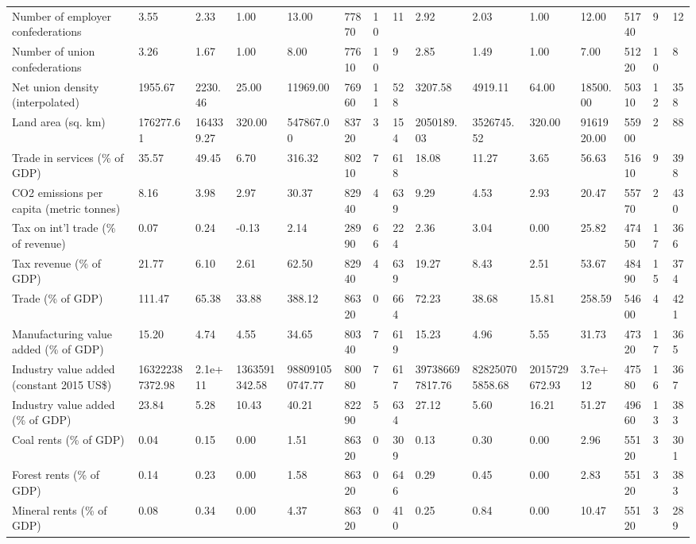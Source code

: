 \begin{longtable}{lllllllllllllll}
\addlinespace
Number of employer confederations & 3.55 & 2.33 & 1.00 & 13.00 & 77870 & 10 & 11 & 2.92 & 2.03 & 1.00 & 12.00 & 51740 & 9 & 12\\
Number of union confederations & 3.26 & 1.67 & 1.00 & 8.00 & 77610 & 10 & 9 & 2.85 & 1.49 & 1.00 & 7.00 & 51220 & 10 & 8\\
Net union density (interpolated) & 1955.67 & 2230.46 & 25.00 & 11969.00 & 76960 & 11 & 528 & 3207.58 & 4919.11 & 64.00 & 18500.00 & 50310 & 12 & 358\\
Land area (sq. km) & 176277.61 & 164339.27 & 320.00 & 547867.00 & 83720 & 3 & 154 & 2050189.03 & 3526745.52 & 320.00 & 9161920.00 & 55900 & 2 & 88\\
Trade in services (\% of GDP) & 35.57 & 49.45 & 6.70 & 316.32 & 80210 & 7 & 618 & 18.08 & 11.27 & 3.65 & 56.63 & 51610 & 9 & 398\\
\addlinespace
CO2 emissions per capita (metric tonnes) & 8.16 & 3.98 & 2.97 & 30.37 & 82940 & 4 & 639 & 9.29 & 4.53 & 2.93 & 20.47 & 55770 & 2 & 430\\
Tax on int'l trade (\% of revenue) & 0.07 & 0.24 & -0.13 & 2.14 & 28990 & 66 & 224 & 2.36 & 3.04 & 0.00 & 25.82 & 47450 & 17 & 366\\
Tax revenue (\% of GDP) & 21.77 & 6.10 & 2.61 & 62.50 & 82940 & 4 & 639 & 19.27 & 8.43 & 2.51 & 53.67 & 48490 & 15 & 374\\
Trade (\% of GDP) & 111.47 & 65.38 & 33.88 & 388.12 & 86320 & 0 & 664 & 72.23 & 38.68 & 15.81 & 258.59 & 54600 & 4 & 421\\
Manufacturing value added (\% of GDP) & 15.20 & 4.74 & 4.55 & 34.65 & 80340 & 7 & 619 & 15.23 & 4.96 & 5.55 & 31.73 & 47320 & 17 & 365\\
\addlinespace
Industry value added (constant 2015 US\$) & 163222387372.98 & 2.1e+11 & 1363591342.58 & 988091050747.77 & 80080 & 7 & 617 & 397386697817.76 & 828250705858.68 & 2015729672.93 & 3.7e+12 & 47580 & 16 & 367\\
Industry value added (\% of GDP) & 23.84 & 5.28 & 10.43 & 40.21 & 82290 & 5 & 634 & 27.12 & 5.60 & 16.21 & 51.27 & 49660 & 13 & 383\\
Coal rents (\% of GDP) & 0.04 & 0.15 & 0.00 & 1.51 & 86320 & 0 & 309 & 0.13 & 0.30 & 0.00 & 2.96 & 55120 & 3 & 301\\
Forest rents (\% of GDP) & 0.14 & 0.23 & 0.00 & 1.58 & 86320 & 0 & 646 & 0.29 & 0.45 & 0.00 & 2.83 & 55120 & 3 & 383\\
Mineral rents (\% of GDP) & 0.08 & 0.34 & 0.00 & 4.37 & 86320 & 0 & 410 & 0.25 & 0.84 & 0.00 & 10.47 & 55120 & 3 & 289\\

\end{longtable}
